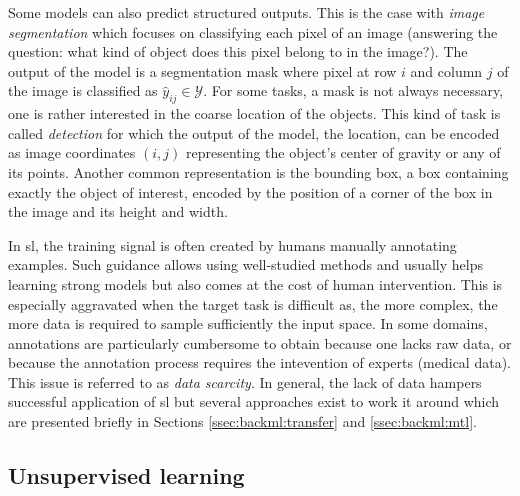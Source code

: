 Some models can also predict structured outputs. This is the case with
\textit{image segmentation} which focuses on classifying each pixel of an image
(\ie answering the question: what kind of object does this pixel belong to in the
image?). The output of the model is a segmentation mask where pixel at row $i$
and column $j$ of the image is classified as $\hat{y}_{ij} \in \mathcal{Y}$. For
some tasks, a mask is not always necessary, one is rather interested in the coarse
location of the objects. This kind of task is called \textit{detection} for which
the output of the model, the location, can be encoded as image coordinates $(i, j)$
representing the object's center of gravity or any of its points. Another common
representation is the bounding box, a box containing exactly the object of interest,
encoded by the position of a corner of the box in the image and its height and
width.

In \acrlong{sl}, the training signal is often created by humans manually annotating
examples. Such guidance allows using well-studied methods and usually helps learning
strong models but also comes at the cost of human intervention. This is especially
aggravated when the target task is difficult as, the more complex, the more data
is required to sample sufficiently the input space. In some domains, annotations
are particularly cumbersome to obtain because one lacks raw data, or because the
annotation process requires the intevention of experts (\eg medical data). This
issue is referred to as \textit{data scarcity}. In general, the lack of data
hampers successful application of \acrlong{sl} but several approaches exist to
work it around which are presented briefly in Sections \ref{ssec:backml:transfer}
and \ref{ssec:backml:mtl}.

\subsection{Unsupervised learning}
\label{ssec:backml:usl}

